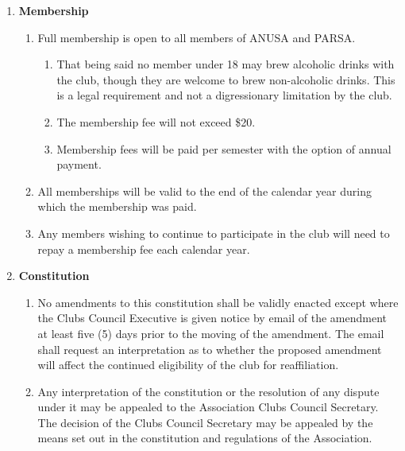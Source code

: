 \documentclass{article}
\begin{document}
\begin{enumerate}[label=\textbf{\arabic*}]
    \item \textbf{Membership}
    \begin{enumerate}[label=5.\arabic*]
        \item Full membership is open to all members of ANUSA and PARSA.
        \begin{enumerate}[label=\alph*.]
            \item That being said no member under 18 may brew alcoholic drinks with the club, though they are welcome to brew non-alcoholic drinks. This is a legal requirement and not a digressionary limitation by the club.
            \item The membership fee will not exceed \$20.
            \item Membership fees will be paid per semester with the option of annual payment.
        \end{enumerate}
        \item All memberships will be valid to the end of the calendar year during which the membership was paid.
        \item Any members wishing to continue to participate in the club will need to repay a membership fee each calendar year.
    \end{enumerate}

    \item \textbf{Constitution}
    \begin{enumerate}[label=6.\arabic*]
        \item No amendments to this constitution shall be validly enacted except where the Clubs Council Executive is given notice by email of the amendment at least five (5) days prior to the moving of the amendment. The email shall request an interpretation as to whether the proposed amendment will affect the continued eligibility of the club for reaffiliation.
        \item Any interpretation of the constitution or the resolution of any dispute under it may be appealed to the Association Clubs Council Secretary. The decision of the Clubs Council Secretary may be appealed by the means set out in the constitution and regulations of the Association.
    \end{enumerate}

\end{enumerate}
\end{document}
